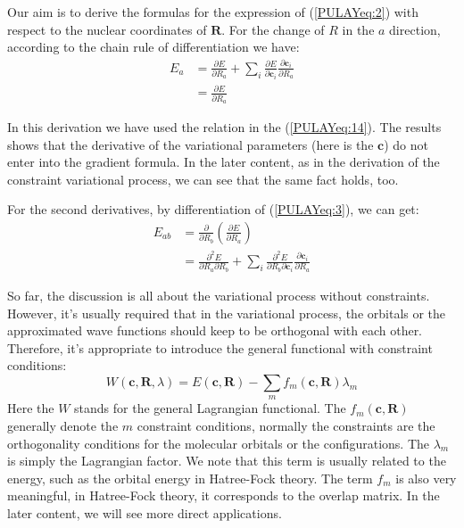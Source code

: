 Our aim is to derive the formulas for the expression of
(\ref{PULAYeq:2}) with respect to the nuclear coordinates of $\bm{R}$.  For
the change of $R$ in the $a$ direction, according to the chain rule of
differentiation we have:
\begin{align}\label{PULAYeq:3}
  E_{a} &= \frac{\partial E}{\partial R_{a}} +\sum_{i}\frac{\partial
    E}{\partial \bm{c}_{i}}\frac{\partial
    \bm{c}_{i}}{\partial R_{a}} \nonumber \\
  &= \frac{\partial E}{\partial R_{a}}
\end{align}

In this derivation we have used the relation in the
(\ref{PULAYeq:14}). The results shows that the derivative of the
variational parameters (here is the $\bm{c}$) do not enter into the
gradient formula. In the later content, as in the derivation of the
constraint variational process, we can see that the same fact holds,
too.

For the second derivatives, by differentiation of (\ref{PULAYeq:3}),
we can get:
\begin{align}\label{}
  E_{ab} &=\frac{\partial}{\partial R_{b}}\left(\frac{\partial
      E}{\partial
      R_{a}}\right) \nonumber \\
  &=\frac{\partial^{2} E}{\partial R_{a}\partial R_{b}}
  +\sum_{i}\frac{\partial^{2} E}{\partial R_{b}\partial
    \bm{c}_{i}}\frac{\partial \bm{c}_{i}}{\partial R_{a}}
\end{align}

So far, the discussion is all about the variational process without
constraints. However, it's usually required that in the variational
process, the orbitals or the approximated wave functions should keep
to be orthogonal with each other. Therefore, it's appropriate to
introduce the general functional with constraint conditions:
\begin{equation}\label{PULAYeq:8}
  W(\bm{c}, \bm{R}, \lambda) = E(\bm{c}, \bm{R}) - \sum_{m}f_{m}(\bm{c},
\bm{R})\lambda_{m}
\end{equation}
Here the $W$ stands for the general Lagrangian functional. The
$f_{m}(\bm{c}, \bm{R})$ generally denote the $m$ constraint conditions, normally
the constraints are the orthogonality conditions for the molecular
orbitals or the configurations. The $\lambda_{m}$ is simply the
Lagrangian factor. We note that this term is usually related to the energy, such
as the orbital energy in Hatree-Fock theory. The term $f_{m}$ is also very
meaningful, in Hatree-Fock theory, it corresponds to the overlap matrix. In the
later content, we will see more direct applications.

